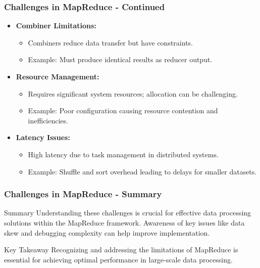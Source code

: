 \documentclass[aspectratio=169]{beamer}
\begin{document}
\begin{frame}[fragile]
    \frametitle{Challenges in MapReduce - Continued}
    \begin{itemize}
        \item \textbf{Combiner Limitations:}
        \begin{itemize}
            \item Combiners reduce data transfer but have constraints.
            \item Example: Must produce identical results as reducer output.
        \end{itemize}

        \item \textbf{Resource Management:}
        \begin{itemize}
            \item Requires significant system resources; allocation can be challenging.
            \item Example: Poor configuration causing resource contention and inefficiencies.
        \end{itemize}

        \item \textbf{Latency Issues:} 
        \begin{itemize}
            \item High latency due to task management in distributed systems.
            \item Example: Shuffle and sort overhead leading to delays for smaller datasets.
        \end{itemize}
    \end{itemize}
\end{frame}

\begin{frame}[fragile]
    \frametitle{Challenges in MapReduce - Summary}
    \begin{block}{Summary}
        Understanding these challenges is crucial for effective data processing solutions within the MapReduce framework. Awareness of key issues like data skew and debugging complexity can help improve implementation.
    \end{block}

    \begin{block}{Key Takeaway}
        Recognizing and addressing the limitations of MapReduce is essential for achieving optimal performance in large-scale data processing.
    \end{block}
\end{frame}
\end{document}
